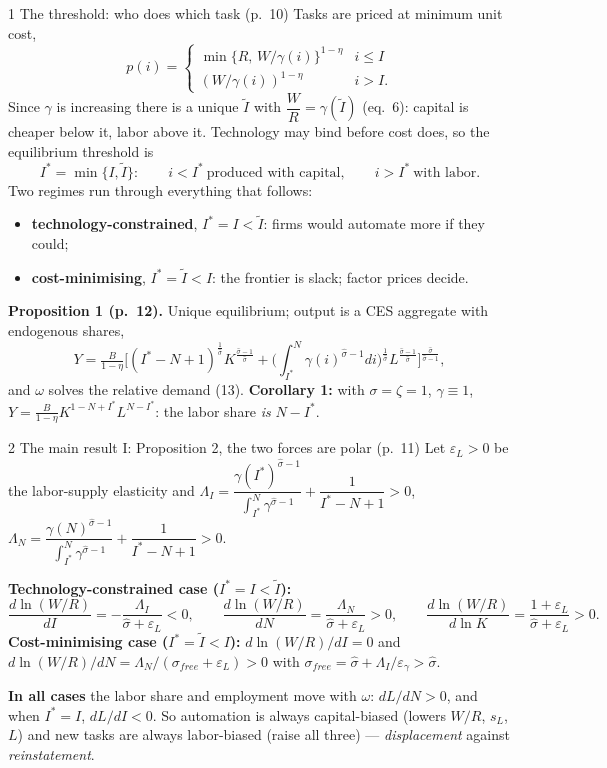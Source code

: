 \documentclass[aspectratio=169,11pt]{beamer}
\begin{document}
\begin{frame}{1 \textperiodcentered{} The threshold: who does which task (p.\ 10)}
  \footnotesize
  Tasks are priced at minimum unit cost,
  \[
    p(i)=\begin{cases}\min\{R,\,W/\gamma(i)\}^{1-\eta} & i\le I\\ (W/\gamma(i))^{1-\eta} & i>I.\end{cases}
  \]
  Since $\gamma$ is increasing there is a unique $\tilde I$ with $\dfrac{W}{R}=\gamma(\tilde I)$ (eq.\ 6): capital
  is cheaper below it, labor above it. Technology may bind before cost does, so the equilibrium threshold is
  \[
    I^*=\min\{I,\tilde I\}:\qquad i<I^*\ \text{produced with capital},\qquad i>I^*\ \text{with labor}.
  \]
  Two regimes run through everything that follows:
  \begin{itemize}
    \item \textbf{technology-constrained}, $I^*=I<\tilde I$: firms would automate more if they could;
    \item \textbf{cost-minimising}, $I^*=\tilde I<I$: the frontier is slack; factor prices decide.
  \end{itemize}
  \textbf{Proposition 1 (p.\ 12).} Unique equilibrium; output is a CES aggregate with endogenous shares,
  \[
    Y=\tfrac{B}{1-\eta}\Big[(I^*-N+1)^{\frac1{\hat\sigma}}K^{\frac{\hat\sigma-1}{\hat\sigma}}
      +\Big(\textstyle\int_{I^*}^N\gamma(i)^{\hat\sigma-1}di\Big)^{\frac1{\hat\sigma}}L^{\frac{\hat\sigma-1}{\hat\sigma}}\Big]^{\frac{\hat\sigma}{\hat\sigma-1}},
  \]
  and $\omega$ solves the relative demand (13). \textbf{Corollary 1:} with $\sigma=\zeta=1$, $\gamma\equiv1$,
  $Y=\frac{B}{1-\eta}K^{1-N+I^*}L^{N-I^*}$: the labor share \emph{is} $N-I^*$.
\end{frame}

\begin{frame}{2 \textperiodcentered{} The main result I: Proposition 2, the two forces are polar (p.\ 11)}
  \footnotesize
  Let $\varepsilon_L>0$ be the labor-supply elasticity and
  $\Lambda_I=\dfrac{\gamma(I^*)^{\hat\sigma-1}}{\int_{I^*}^N\gamma^{\hat\sigma-1}}+\dfrac1{I^*-N+1}>0$,
  $\Lambda_N=\dfrac{\gamma(N)^{\hat\sigma-1}}{\int_{I^*}^N\gamma^{\hat\sigma-1}}+\dfrac1{I^*-N+1}>0$.

  \textbf{Technology-constrained case ($I^*=I<\tilde I$):}
  \[
    \frac{d\ln(W/R)}{dI}=-\frac{\Lambda_I}{\hat\sigma+\varepsilon_L}<0,\qquad
    \frac{d\ln(W/R)}{dN}=\frac{\Lambda_N}{\hat\sigma+\varepsilon_L}>0,\qquad
    \frac{d\ln(W/R)}{d\ln K}=\frac{1+\varepsilon_L}{\hat\sigma+\varepsilon_L}>0.
  \]
  \textbf{Cost-minimising case ($I^*=\tilde I<I$):} $d\ln(W/R)/dI=0$ and
  $d\ln(W/R)/dN=\Lambda_N/(\sigma_{free}+\varepsilon_L)>0$ with $\sigma_{free}=\hat\sigma+\Lambda_I/\varepsilon_\gamma>\hat\sigma$.

  \smallskip
  \textbf{In all cases} the labor share and employment move with $\omega$: $dL/dN>0$, and when $I^*=I$,
  $dL/dI<0$. So automation is always capital-biased (lowers $W/R$, $s_L$, $L$) and new tasks are always
  labor-biased (raise all three) --- \emph{displacement} against \emph{reinstatement}.
\end{frame}
\end{document}
